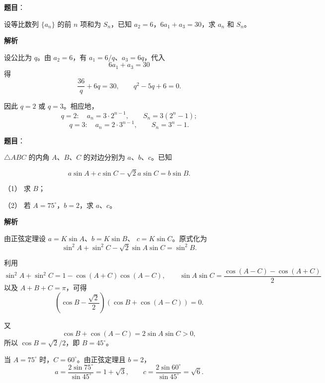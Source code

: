 \begin{answer}

\textbf{题目}：

设等比数列 $\{a_n\}$ 的前 $n$ 项和为 $S_n$，已知 $a_2=6$，$6a_1+a_3=30$，求 $a_n$ 和 $S_n$。

\textbf{解析}

设公比为 $q$。由 $a_2=6$，有
$a_1=6/q$、$a_3=6q$，代入
\nopagebreak[4]
\[
6a_1+a_3=30
\]
得
\nopagebreak[4]
\[
\frac{36}{q}+6q=30,\qquad q^2-5q+6=0.
\]

因此 $q=2$ 或 $q=3$。相应地，
\nopagebreak[4]
\[
q=2:\quad a_n=3\cdot2^{n-1},\qquad
S_n=3(2^n-1);
\]
\nopagebreak[4]
\[
q=3:\quad a_n=2\cdot3^{n-1},\qquad
S_n=3^n-1.
\]


\end{answer}
\begin{answer}

\textbf{题目}：

$\triangle ABC$ 的内角 $A\text{、}B\text{、}C$ 的对边分别为 $a\text{、}b\text{、}c$。已知

\nopagebreak[4]
\[
a\sin A+c\sin C-\sqrt2a\sin C=b\sin B.
\]

（1） 求 $B$；

（2） 若 $A=75^\circ$，$b=2$，求 $a\text{、}c$。

\textbf{解析}


由正弦定理设 $a=K\sin A$、$b=K\sin B$、
$c=K\sin C$。原式化为
\nopagebreak[4]
\[
\sin^2A+\sin^2C-\sqrt2\sin A\sin C=\sin^2B.
\]

利用
\nopagebreak[4]
\[
\sin^2A+\sin^2C=1-\cos(A+C)\cos(A-C),
\qquad
\sin A\sin C=\frac{\cos(A-C)-\cos(A+C)}2
\]
以及 $A+B+C=\pi$，可得
\nopagebreak[4]
\[
\left(\cos B-\frac{\sqrt2}{2}\right)
\left(\cos B+\cos(A-C)\right)=0.
\]

又
\nopagebreak[4]
\[
\cos B+\cos(A-C)=2\sin A\sin C>0,
\]
所以 $\cos B=\sqrt2/2$，即 $B=45^\circ$。


当 $A=75^\circ$ 时，$C=60^\circ$。由正弦定理且 $b=2$，
\nopagebreak[4]
\[
a=\frac{2\sin75^\circ}{\sin45^\circ}=1+\sqrt3,
\qquad
c=\frac{2\sin60^\circ}{\sin45^\circ}=\sqrt6.
\]



\end{answer}
